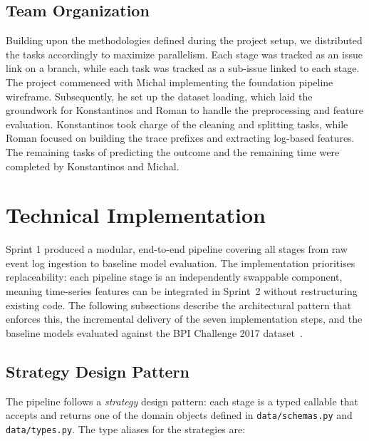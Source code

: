 \documentclass[runningheads]{llncs}
\begin{document}
\subsection{Team Organization}

Building upon the methodologies defined during the project setup, we distributed the tasks accordingly to maximize parallelism. Each stage was tracked as an issue link on a branch, while each task was tracked as a sub-issue linked to each stage. The project commenced with Michal implementing the foundation pipeline wireframe. Subsequently, he set up the dataset loading, which laid the groundwork for Konstantinos and Roman to handle the preprocessing and feature evaluation. Konstantinos took charge of the cleaning and splitting tasks, while Roman focused on building the trace prefixes and extracting log-based features. The remaining tasks of predicting the outcome and the remaining time were completed by Konstantinos and Michal.


\section{Technical Implementation}

Sprint 1 produced a modular, end-to-end pipeline covering all stages from raw event log ingestion to baseline model evaluation. The implementation prioritises replaceability: each pipeline stage is an independently swappable component, meaning time-series features can be integrated in Sprint~2 without restructuring existing code. The following subsections describe the architectural pattern that enforces this, the incremental delivery of the seven implementation steps, and the baseline models evaluated against the BPI Challenge 2017 dataset~\cite{bpic2017}.

\subsection{Strategy Design Pattern}

The pipeline follows a \emph{strategy} design pattern: each stage is a typed callable that accepts and returns one of the domain objects defined in \texttt{data/schemas.py} and \texttt{data/types.py}. The type aliases for the strategies are:
\end{document}

